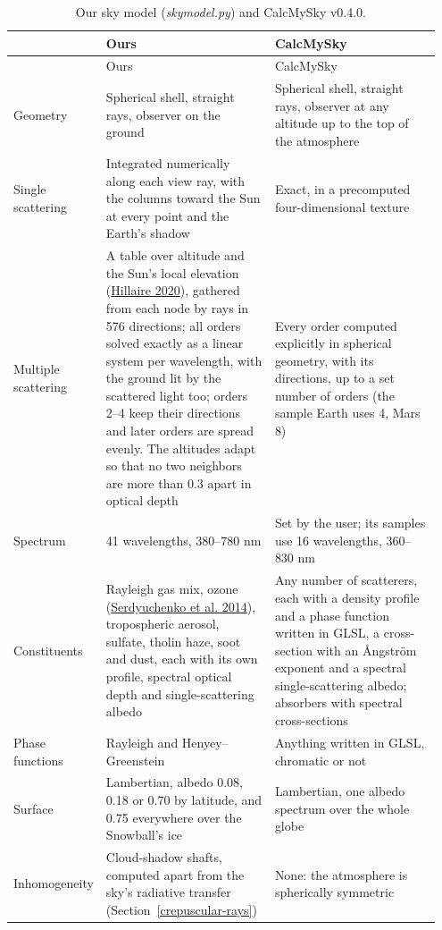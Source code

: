 \documentclass[9pt,twocolumn]{extarticle}
\begin{document}
{\small
{}
\begin{longtable}{@{}p{0.15\linewidth}p{0.4\linewidth}p{0.4\linewidth}@{}}
\caption{Our sky model (\emph{skymodel.py}) and CalcMySky v0.4.0.}\label{tab:calcmysky-methods}\\ \toprule
& Ours & CalcMySky \\ \midrule \endfirsthead
\toprule & Ours & CalcMySky \\ \midrule \endhead
Geometry & Spherical shell, straight rays, observer on the ground & Spherical shell, straight rays, observer at any altitude up to the top of the atmosphere \\
Single scattering & Integrated numerically along each view ray, with the columns toward the Sun at every point and the Earth's shadow & Exact, in a precomputed four-dimensional texture \\
Multiple scattering & A table over altitude and the Sun's local elevation (\protect\hyperlink{cite.hillaire2020}{Hillaire 2020}), gathered from each node by rays in 576 directions; all orders solved exactly as a linear system per wavelength, with the ground lit by the scattered light too; orders 2--4 keep their directions and later orders are spread evenly. The altitudes adapt so that no two neighbors are more than 0.3 apart in optical depth & Every order computed explicitly in spherical geometry, with its directions, up to a set number of orders (the sample Earth uses 4, Mars 8) \\
Spectrum & 41 wavelengths, 380--780 nm & Set by the user; its samples use 16 wavelengths, 360--830 nm \\
Constituents & Rayleigh gas mix, ozone (\protect\hyperlink{cite.serdyuchenko2014}{Serdyuchenko et al. 2014}), tropospheric aerosol, sulfate, tholin haze, soot and dust, each with its own profile, spectral optical depth and single-scattering albedo & Any number of scatterers, each with a density profile and a phase function written in GLSL, a cross-section with an Ångström exponent and a spectral single-scattering albedo; absorbers with spectral cross-sections \\
Phase functions & Rayleigh and Henyey--Greenstein & Anything written in GLSL, chromatic or not \\
Surface & Lambertian, albedo 0.08, 0.18 or 0.70 by latitude, and 0.75 everywhere over the Snowball's ice & Lambertian, one albedo spectrum over the whole globe \\
Inhomogeneity & Cloud-shadow shafts, computed apart from the sky's radiative transfer (Section~\ref{crepuscular-rays}) & None: the atmosphere is spherically symmetric \\

\end{longtable}}
\end{document}
